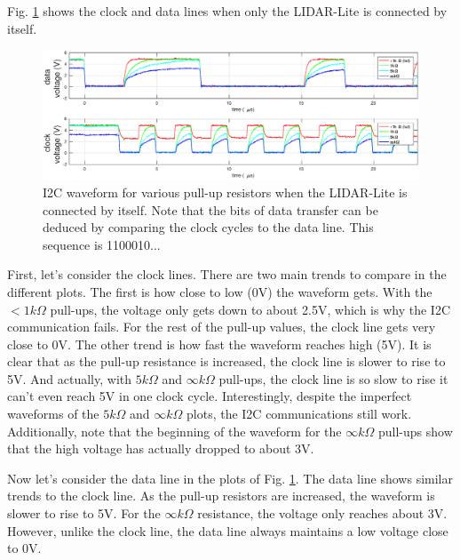 \documentclass[10pt]{article}
\begin{document}
Fig. \ref{fig:LL} shows the clock and data lines when only the LIDAR-Lite is connected by itself.
\begin{figure}[ht]
\newcommand{\wdt}{.24\textwidth}
\centering

\includegraphics[width=1.0\textwidth]{../2pt5microsec/LL_cropped.eps}
\caption{I2C waveform for various pull-up resistors when the LIDAR-Lite is connected by itself. Note that the bits of data transfer can be deduced by comparing the clock cycles to the data line. This sequence is 1100010...}
\label{fig:LL}
\end{figure}
First, let's consider the clock lines. There are two main trends to compare in the different plots. The first is how close to low (0V) the waveform gets. With the $<1k\Omega$ pull-ups, the voltage only gets down to about 2.5V, which is why the I2C communication fails. For the rest of the pull-up values, the clock line gets very close to 0V. The other trend is how fast the waveform reaches high (5V). It is clear that as the pull-up resistance is increased, the clock line is slower to rise to 5V. And actually, with $5 k \Omega$ and $\infty k \Omega$ pull-ups, the clock line is so slow to rise it can't even reach 5V in one clock cycle.  Interestingly, despite the imperfect waveforms of the $5 k \Omega$ and $\infty k \Omega$ plots, the I2C communications still work. Additionally, note that the beginning of the waveform for the $\infty k \Omega$ pull-ups show that the high voltage has actually dropped to about 3V.

Now let's consider the data line in the plots of Fig. \ref{fig:LL}. The data line shows similar trends to the clock line. As the pull-up resistors are increased, the waveform is slower to rise to 5V. For the $\infty k \Omega$ resistance, the voltage only reaches about 3V. However, unlike the clock line, the data line always maintains a low voltage close to 0V.
\end{document}
